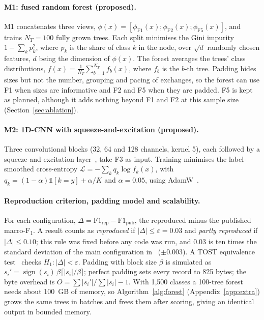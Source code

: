 \documentclass[pdflatex,sn-mathphys-num]{sn-jnl}
\newcommand{\Fone}{F\textsubscript{1}}
\begin{document}
\paragraph{M1: fused random forest (proposed).} M1 concatenates three views, $\phi(x)=[\phi_{\mathrm{F1}}(x);\phi_{\mathrm{F2}}(x);\phi_{\mathrm{F5}}(x)]$, and trains $N_T=100$ fully grown trees. Each split minimises the Gini impurity $1-\sum_k p_k^2$, where $p_k$ is the share of class $k$ in the node, over $\sqrt{d}$ randomly chosen features, $d$ being the dimension of $\phi(x)$. The forest averages the trees' class distributions, $f(x)=\frac{1}{N_T}\sum_{b=1}^{N_T} f_b(x)$, where $f_b$ is the $b$-th tree. Padding hides sizes but not the number, grouping and pacing of exchanges, so the forest can use F1 when sizes are informative and F2 and F5 when they are padded. F5 is kept as planned, although it adds nothing beyond F1 and F2 at this sample size (Section~\ref{sec:ablation}).

\paragraph{M2: 1D-CNN with squeeze-and-excitation (proposed).} Three convolutional blocks (32, 64 and 128 channels, kernel 5), each followed by a squeeze-and-excitation layer~\cite{hu2018se}, take F3 as input. Training minimises the label-smoothed cross-entropy $\mathcal{L}=-\sum_k q_k\log f_k(x)$, with $q_k=(1-\alpha)\mathbb{1}[k=y]+\alpha/K$ and $\alpha=0.05$, using AdamW~\cite{loshchilov2019adamw}.

\paragraph{Reproduction criterion, padding model and scalability.} For each configuration, $\Delta=\mathrm{F1}_{\mathrm{rep}}-\mathrm{F1}_{\mathrm{pub}}$, the reproduced minus the published macro-\Fone{}. A result counts as \emph{reproduced} if $|\Delta|\le\varepsilon=0.03$ and \emph{partly reproduced} if $|\Delta|\le0.10$; this rule was fixed before any code was run, and 0.03 is ten times the standard deviation of the main configuration in~\cite{siby2020} ($\pm0.003$). A TOST equivalence test~\cite{schuirmann1987tost} checks $H_1:|\Delta|<\varepsilon$. Padding with block size $\beta$ is simulated as $s_i'=\operatorname{sign}(s_i)\,\beta\lceil|s_i|/\beta\rceil$; perfect padding sets every record to 825 bytes; the byte overhead is $O=\sum|s_i'|/\sum|s_i|-1$. With 1,500 classes a 100-tree forest needs about 100~GB of memory, so Algorithm~\ref{alg:forest} (Appendix~\ref{app:extra}) grows the same trees in batches and frees them after scoring, giving an identical output in bounded memory.
\end{document}
